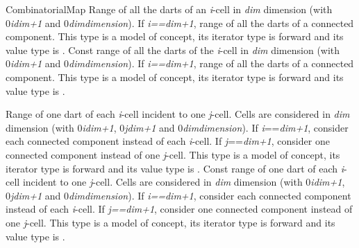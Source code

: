 \begin{ccRefConcept}{CombinatorialMap}
{Range of all the darts of an \emph{i}-cell in \emph{dim} dimension
  (with 0\myleq{}\emph{i}\myleq{}\emph{dim+1} and 0\myleq{}\emph{dim}\myleq{}\emph{dimension}). If \emph{i==dim+1},  
  range of all the darts of a connected component.
  This type is a model of  concept, its iterator type is forward and its value type is .}
\ccGlue
{}
{Const range of all the darts of the \emph{i}-cell in \emph{dim} dimension 
  (with 0\myleq{}\emph{i}\myleq{}\emph{dim+1} and 0\myleq{}\emph{dim}\myleq{}\emph{dimension}). If \emph{i==dim+1},  
  range of all the darts of a connected component.
  This type is a model of  concept, its iterator type is forward and its value type is .}

{Range of one dart of each \emph{i}-cell incident to one \emph{j}-cell.
  Cells are considered in \emph{dim} dimension  
  (with 0\myleq{}\emph{i}\myleq{}\emph{dim+1}, 0\myleq{}\emph{j}\myleq{}\emph{dim+1} and 
   0\myleq{}\emph{dim}\myleq{}\emph{dimension}). If \emph{i}==\emph{dim+1},  
  consider each connected component instead of each \emph{i}-cell. If \emph{j}==\emph{dim+1},
  consider one connected component instead of one \emph{j}-cell.	
  This type is a model of  concept, its iterator type is forward and its value type is .}
\ccGlue
{}
{Const range of one dart of each \emph{i}-cell incident to one \emph{j}-cell.
  Cells are considered in \emph{dim} dimension  
  (with 0\myleq{}\emph{i}\myleq{}\emph{dim+1}, 0\myleq{}\emph{j}\myleq{}\emph{dim+1} and 
   0\myleq{}\emph{dim}\myleq{}\emph{dimension}). If \emph{i==dim+1},  
  consider each connected component instead of each \emph{i}-cell. If \emph{j==dim+1},
  consider one connected component instead of one \emph{j}-cell.
  This type is a model of  concept, its iterator type is forward and its value type is .}


\end{ccRefConcept}
